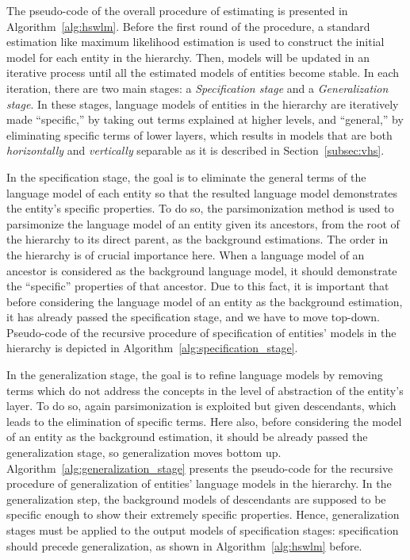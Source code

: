 The pseudo-code of the overall procedure of estimating \achswlm is presented in Algorithm~\ref{alg:hswlm}. 
Before the first round of the procedure, a standard estimation like maximum likelihood estimation is used to construct the initial model for each entity in the hierarchy. 
Then, models will be updated in an iterative process until all the estimated models of entities become stable. 
In each iteration, there are two main stages: a \emph{Specification stage} and a \emph{Generalization stage}. 
In these stages, language models of entities in the hierarchy are iteratively made ``specific,'' by taking out terms explained at higher levels, and ``general,'' by eliminating specific terms of lower layers, which results in models that are both \emph{horizontally} and \emph{vertically} separable as it is described in Section~\ref{subsec:vhs}.

In the specification stage, the goal is to eliminate the general terms of the language model of each entity so that the resulted language model demonstrates the entity's specific properties.  
To do so, the parsimonization method is used to parsimonize the language model of an entity given its ancestors, from the root of the hierarchy to its direct parent, as the background estimations. 
%
The order in the hierarchy is of crucial importance here. 
When a language model of an ancestor is considered as the background language model, it should demonstrate the ``specific'' properties of that ancestor. Due to this fact, it is important that before considering the language model of an entity as the background estimation, it has already passed the specification stage, and we have to move top-down.
Pseudo-code of the recursive procedure of specification of entities' models in the hierarchy is depicted in Algorithm~\ref{alg:specification_stage}.




In the generalization stage, the goal is to refine language models by removing terms which do not address the concepts in the level of abstraction of the entity's layer.
To do so, again parsimonization is exploited but given descendants, which leads to the elimination of specific terms. 
Here also, before considering the model of an entity as the background estimation, it should be already passed the generalization stage, so generalization moves bottom up.
Algorithm~\ref{alg:generalization_stage} presents the pseudo-code for the recursive procedure of generalization of entities' language models in the hierarchy. 
In the generalization step, the background models of descendants are supposed to be specific enough to show their extremely specific properties. Hence, generalization stages must be applied to the output models of specification stages: specification should precede generalization, as shown in Algorithm~\ref{alg:hswlm} before.
